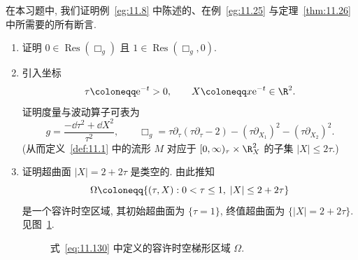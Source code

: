 \begin{exer}[标量波动算子的谐振]\label{ex:11.1}
在本习题中, 我们证明例~\ref{eg:11.8} 中陈述的、在例~\ref{eg:11.25} 与定理~\ref{thm:11.26} 中所需要的所有断言.
\begin{enumerate}[label=(\arabic*)]
    \item 证明 $0 \in \operatorname{Res}(\Box_g)$ 且 $1 \in \operatorname{Res}(\Box_g, 0)$.
    \item 引入坐标
    \begin{equation}\label{eq:11.128}
        \tau \defeq \ee^{-t} > 0, \qquad X \defeq x \ee^{-t} \in \R^2.
    \end{equation}
    证明度量与波动算子可表为
    \begin{equation}\label{eq:11.129}
        g = \frac{-\dd\tau^2 + \dd X^2}{\tau^2}, \qquad \Box_g = \tau \partial_\tau(\tau \partial_\tau - 2) - (\tau \partial_{X_1})^2 - (\tau \partial_{X_2})^2.
    \end{equation}
    (从而定义~\ref{def:11.1} 中的流形 $M$ 对应于 $[0, \infty)_\tau \times \R_X^2$ 的子集 $|X| \le 2\tau$.)
    \item 证明超曲面 $|X| = 2 + 2\tau$ 是类空的. 由此推知
    \begin{equation}\label{eq:11.130}
        \Omega \defeq \{(\tau, X) : 0 < \tau \le 1, \; |X| \le 2 + 2\tau\}
    \end{equation}
    是一个容许时空区域, 其初始超曲面为 $\{\tau = 1\}$, 终值超曲面为 $\{|X| = 2 + 2\tau\}$. 见图~\ref{fig:11.7}.

    \begin{figure}[htbp]
    \centering
    \drawFigElevenSeven
    \caption{式~\eqref{eq:11.130} 中定义的容许时空梯形区域 $\Omega$.}\label{fig:11.7}
    \end{figure}


\end{enumerate}
\end{exer}
